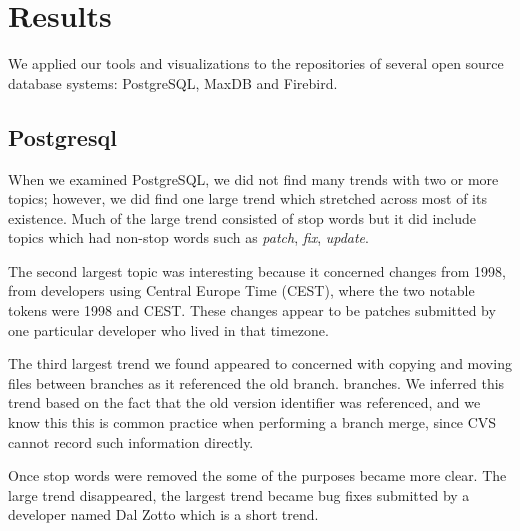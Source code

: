 \documentclass[times, 10pt,twocolumn]{article}
\begin{document}









\section{Results}

We applied our tools and visualizations to the repositories of several
open source database systems: PostgreSQL, MaxDB and Firebird.




\subsection{Postgresql}


When we examined PostgreSQL, we did not find many trends with two or more topics; however, we did find one large trend which stretched across most of its existence.
 Much of the large trend consisted of stop words but it did
include topics which had non-stop words such as \emph{patch}, \emph{fix}, \emph{update}.

The second largest topic was interesting because it concerned changes from
1998, from developers using Central Europe Time (CEST), where the two
notable tokens were 1998 and CEST. These changes appear to be patches
submitted by one particular developer who lived in that timezone.

The third largest trend we found appeared to concerned with copying
and moving files between branches as it referenced the old branch.
branches.  We inferred this trend based on the fact that the old
version identifier was referenced, and we know this this is common
practice when performing a branch merge, since CVS cannot record such
information directly.


Once stop words were removed the some of the purposes became more
clear. The large trend disappeared, the largest trend became bug fixes
submitted by a developer named Dal Zotto which is a short trend.
\end{document}
